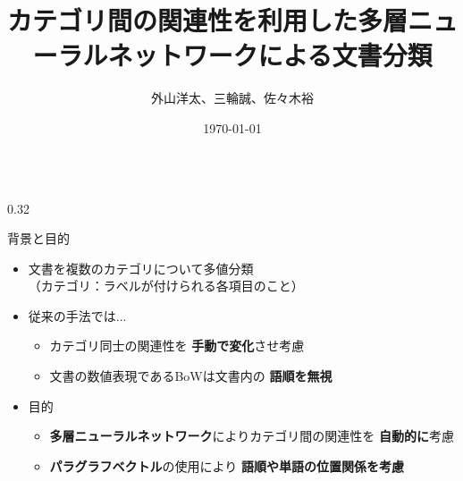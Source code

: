 \documentclass[8pt,unicode]{beamer}
\title{カテゴリ間の関連性を利用した多層ニューラルネットワークによる文書分類}
\author{外山洋太、三輪誠、佐々木裕}
\institute{豊田工業大学 工学部 先端工学基礎学科}
\date{\today}
\newcommand{\columnscale}{0.32}
\newcommand{\good}[1]{\textbf{\color{orange} #1}}
\newcommand{\bad}[1]{\textbf{\color{blue} #1}}
\newcommand{\keyword}[1]{\textbf{\color{red} #1}}
\begin{document}
\begin{frame}{}
\begin{columns}[t]

\begin{column}{\columnscale\textwidth} %
  \begin{block}{背景と目的}
    \begin{itemize}
      \item 文書を複数のカテゴリについて多値分類 \\
        （カテゴリ：ラベルが付けられる各項目のこと）
      \item 従来の手法では...
        \begin{itemize}
          \item カテゴリ同士の関連性を\bad{手動で変化}させ考慮 \\
          \item 文書の数値表現であるBoWは文書内の\bad{語順を無視} \\
        \end{itemize}
      \item 目的 \\
        \begin{itemize}
          \item \keyword{多層ニューラルネットワーク}によりカテゴリ間の関連性を
            \good{自動的に}考慮 \\
          \item \keyword{パラグラフベクトル}の使用により
            \good{語順や単語の位置関係を考慮}
        \end{itemize}
    \end{itemize}
  \end{block}


\end{column}
\end{columns}
\end{frame}
\end{document}
